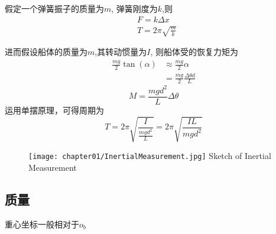 假定一个弹簧振子的质量为$m$, 弹簧刚度为$k$,则
\begin{equation}
  \begin{aligned}
    &F=k \Delta x \\
    &T= 2 \pi \sqrt{\frac{m}{k}}
  \end{aligned}
\end{equation}

进而假设船体的质量为$m$,其转动惯量为$I$, 则船体受的恢复力矩为
\begin{equation}
  \begin{aligned}
    \frac{mg}{2} \tan(\alpha)   &\approx   \frac{mg}{2} \alpha \\
    &=\frac{mg}{2}\frac{\Delta \theta d}{L}
  \end{aligned}
\end{equation}
\begin{equation}
  M=\frac{mgd^2 }{L} \Delta \theta
\end{equation}
运用单摆原理，可得周期为
\begin{equation}
  T=2 \pi \sqrt{\frac{I}{\frac{mgd^2 }{L} }} = 2 \pi \sqrt{\frac{I L}{mgd^2}}
\end{equation}


\begin{figure}[!htp]
  \centering
  \texttt{[image: chapter01/InertialMeasurement.jpg]}
    {Sketch of Inertial Measurement}
  \label{fig:InertialMeasurement}
\end{figure}


\subsection{质量}
重心坐标一般相对于$o_b$
